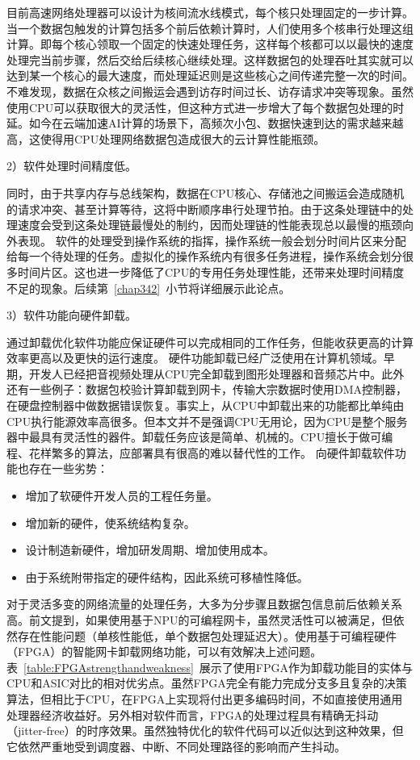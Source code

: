 目前高速网络处理器可以设计为核间流水线模式，每个核只处理固定的一步计算。当一个数据包触发的计算包括多个前后依赖计算时，人们使用多个核串行处理这组计算。即每个核心领取一个固定的快速处理任务，这样每个核都可以以最快的速度处理完当前步骤，然后交给后续核心继续处理。这样数据包的处理吞吐其实就可以达到某一个核心的最大速度，而处理延迟则是这些核心之间传递完整一次的时间。不难发现，数据在众核之间搬运会遇到访存时间过长、访存请求冲突等现象。虽然使用CPU可以获取很大的灵活性，但这种方式进一步增大了每个数据包处理的时延。如今在云端加速AI计算的场景下，高频次小包、数据快速到达的需求越来越高，这使得用CPU处理网络数据包造成很大的云计算性能瓶颈。

2）软件处理时间精度低。

同时，由于共享内存与总线架构，数据在CPU核心、存储池之间搬运会造成随机的请求冲突、甚至计算等待，这将中断顺序串行处理节拍。由于这条处理链中的处理速度会受到这条处理链最慢处的制约，因而处理链的性能表现总以最慢的瓶颈向外表现。
软件的处理受到操作系统的指挥，操作系统一般会划分时间片区来分配给每一个待处理的任务。虚拟化的操作系统内有很多任务进程，操作系统会划分很多时间片区。这也进一步降低了CPU的专用任务处理性能，还带来处理时间精度不足的现象。后续第~\ref{chap342}~小节将详细展示此论点。

3）软件功能向硬件卸载。

通过卸载优化软件功能应保证硬件可以完成相同的工作任务，但能收获更高的计算效率更高以及更快的运行速度。
硬件功能卸载已经广泛使用在计算机领域。早期，开发人已经把音视频处理从CPU完全卸载到图形处理器和音频芯片中。此外还有一些例子：数据包校验计算卸载到网卡，传输大宗数据时使用DMA控制器，在硬盘控制器中做数据错误恢复。事实上，从CPU中卸载出来的功能都比单纯由CPU执行能源效率高很多。但本文并不是强调CPU无用论，因为CPU是整个服务器中最具有灵活性的器件。卸载任务应该是简单、机械的。CPU擅长于做可编程、花样繁多的算法，应部署具有很高的难以替代性的工作。
向硬件卸载软件功能也存在一些劣势：

\begin{itemize}
	\item 增加了软硬件开发人员的工程任务量。
	\item 增加新的硬件，使系统结构复杂。
	\item 设计制造新硬件，增加研发周期、增加使用成本。
	\item 由于系统附带指定的硬件结构，因此系统可移植性降低。
\end{itemize}

对于灵活多变的网络流量的处理任务，大多为分步骤且数据包信息前后依赖关系高。前文提到，如果使用基于NPU的可编程网卡，虽然灵活性可以被满足，但依然存在性能问题（单核性能低，单个数据包处理延迟大）。使用基于可编程硬件（FPGA）的智能网卡卸载网络功能，可以有效解决上述问题。表~\ref{table:FPGAstrengthandweakness}~展示了使用FPGA作为卸载功能目的实体与CPU和ASIC对比的相对优劣点。虽然FPGA完全有能力完成分支多且复杂的决策算法，但相比于CPU，在FPGA上实现将付出更多编码时间，不如直接使用通用处理器经济收益好。另外相对软件而言，FPGA的处理过程具有精确无抖动（jitter-free）的时序效果。虽然独特优化的软件代码可以近似达到这种效果，但它依然严重地受到调度器、中断、不同处理路径的影响而产生抖动。


